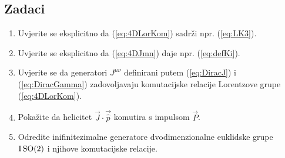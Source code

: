 \subsection*{Zadaci}

\begin{enumerate}[label=\arabic{chapter}.\arabic*.]

\item Uvjerite se eksplicitno da (\ref{eq:4DLorKom}) sadrži npr. (\ref{eq:LK3}).

\item Uvjerite se eksplicitno da (\ref{eq:4DJmn}) daje npr. (\ref{eq:defKi}).

\item Uvjerite se da generatori $J^{\mu\nu}$ definirani putem
(\ref{eq:DiracJ}) i (\ref{eq:DiracGamma}) zadovoljavaju komutacijske
relacije Lorentzove grupe (\ref{eq:4DLorKom}).

\item Pokažite da helicitet $\vec{J}\cdot\vec{\hat{p}}$ komutira s impulsom $\vec{P}$.
    \label{zad:help}

\item Odredite inifinitezimalne generatore dvodimenzionalne euklidske
    grupe $\mathrm{I}\,\mathrm{SO}(2)$ i njihove komutacijske relacije.\label{zad:iso2gen}
\end{enumerate}
